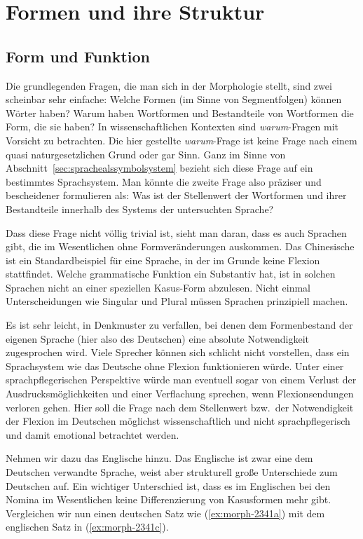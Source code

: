\section{Formen und ihre Struktur}

\label{sec:morphkond}

\subsection{Form und Funktion}

\label{sec:morphgrundl}

Die grundlegenden Fragen, die man sich in der Morphologie stellt, sind zwei scheinbar sehr einfache:
Welche Formen (im Sinne von Segmentfolgen) können Wörter haben?
Warum haben Wortformen und Bestandteile von Wortformen die Form, die sie haben?
In wissenschaftlichen Kontexten sind \textit{warum}-Fragen mit Vorsicht zu betrachten.
Die hier gestellte \textit{warum}-Frage ist keine Frage nach einem quasi naturgesetzlichen Grund oder gar Sinn.
Ganz im Sinne von Abschnitt~\ref{sec:sprachealssymbolsystem} bezieht sich diese Frage auf ein bestimmtes Sprachsystem.
Man könnte die zweite Frage also präziser und bescheidener formulieren als:
Was ist der Stellenwert der Wortformen und ihrer Bestandteile innerhalb des Systems der untersuchten Sprache?

Dass diese Frage nicht völlig trivial ist, sieht man daran, dass es auch Sprachen gibt, die im Wesentlichen ohne Formveränderungen auskommen.
Das Chinesische ist ein Standardbeispiel für eine Sprache, in der im Grunde keine Flexion stattfindet.
Welche grammatische Funktion \zB ein Substantiv hat, ist in solchen Sprachen nicht an einer speziellen Kasus-Form abzulesen.
Nicht einmal Unterscheidungen wie Singular und Plural müssen Sprachen prinzipiell machen.

Es ist sehr leicht, in Denkmuster zu verfallen, bei denen dem Formenbestand der eigenen Sprache (hier also des Deutschen) eine absolute Notwendigkeit zugesprochen wird.
Viele Sprecher können sich schlicht nicht vorstellen, dass ein Sprachsystem wie das Deutsche ohne Flexion funktionieren würde.
Unter einer sprachpflegerischen Perspektive würde man eventuell sogar von einem Verlust der Ausdrucksmöglichkeiten und einer Verflachung sprechen, wenn Flexionsendungen verloren gehen.
Hier soll die Frage nach dem Stellenwert bzw.\ der Notwendigkeit der Flexion im Deutschen möglichst wissenschaftlich und nicht sprachpflegerisch und damit emotional betrachtet werden.

Nehmen wir dazu das Englische hinzu.
Das Englische ist zwar eine dem Deutschen verwandte Sprache, weist aber strukturell große Unterschiede zum Deutschen auf.
Ein wichtiger Unterschied ist, dass es im Englischen bei den Nomina im Wesentlichen keine Differenzierung von Kasusformen mehr gibt.
Vergleichen wir nun einen deutschen Satz wie (\ref{ex:morph-2341a}) mit dem englischen Satz in (\ref{ex:morph-2341c}).

